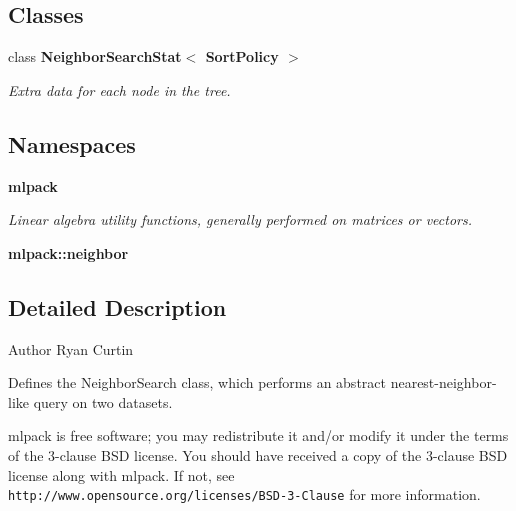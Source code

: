 \subsection*{Classes}
\begin{DoxyCompactItemize}
\item 
class \textbf{ Neighbor\+Search\+Stat$<$ Sort\+Policy $>$}
\begin{DoxyCompactList}\small\item\em Extra data for each node in the tree. \end{DoxyCompactList}\end{DoxyCompactItemize}
\subsection*{Namespaces}
\begin{DoxyCompactItemize}
\item 
 \textbf{ mlpack}
\begin{DoxyCompactList}\small\item\em Linear algebra utility functions, generally performed on matrices or vectors. \end{DoxyCompactList}\item 
 \textbf{ mlpack\+::neighbor}
\end{DoxyCompactItemize}


\subsection{Detailed Description}
\begin{DoxyAuthor}{Author}
Ryan Curtin
\end{DoxyAuthor}
Defines the Neighbor\+Search class, which performs an abstract nearest-\/neighbor-\/like query on two datasets.

mlpack is free software; you may redistribute it and/or modify it under the terms of the 3-\/clause B\+SD license. You should have received a copy of the 3-\/clause B\+SD license along with mlpack. If not, see {\tt http\+://www.\+opensource.\+org/licenses/\+B\+S\+D-\/3-\/\+Clause} for more information. 